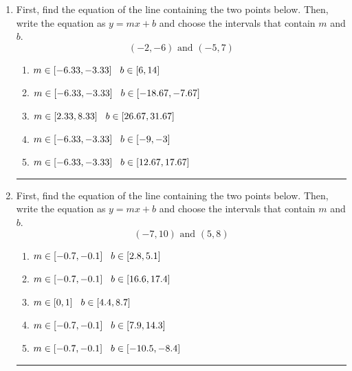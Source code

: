\documentclass[14pt]{extbook}
\newcommand{\litem}[1]{\item#1\hspace*{-1cm}\rule{\textwidth}{0.4pt}}
\begin{document}
\begin{enumerate}
{\begin{enumerate}[label=\Alph*.]
\end{enumerate} }
\litem{
First, find the equation of the line containing the two points below. Then, write the equation as $ y=mx+b $ and choose the intervals that contain $m$ and $b$.\[ (-2, -6) \text{ and } (-5, 7) \]\begin{enumerate}[label=\Alph*.]
\item \( m \in [-6.33, -3.33] \hspace*{3mm} b \in [6, 14] \)
\item \( m \in [-6.33, -3.33] \hspace*{3mm} b \in [-18.67, -7.67] \)
\item \( m \in [2.33, 8.33] \hspace*{3mm} b \in [26.67, 31.67] \)
\item \( m \in [-6.33, -3.33] \hspace*{3mm} b \in [-9, -3] \)
\item \( m \in [-6.33, -3.33] \hspace*{3mm} b \in [12.67, 17.67] \)

\end{enumerate} }
\litem{
First, find the equation of the line containing the two points below. Then, write the equation as $ y=mx+b $ and choose the intervals that contain $m$ and $b$.\[ (-7, 10) \text{ and } (5, 8) \]\begin{enumerate}[label=\Alph*.]
\item \( m \in [-0.7, -0.1] \hspace*{3mm} b \in [2.8, 5.1] \)
\item \( m \in [-0.7, -0.1] \hspace*{3mm} b \in [16.6, 17.4] \)
\item \( m \in [0, 1] \hspace*{3mm} b \in [4.4, 8.7] \)
\item \( m \in [-0.7, -0.1] \hspace*{3mm} b \in [7.9, 14.3] \)
\item \( m \in [-0.7, -0.1] \hspace*{3mm} b \in [-10.5, -8.4] \)


\end{enumerate}}
\end{enumerate}
\end{document}
